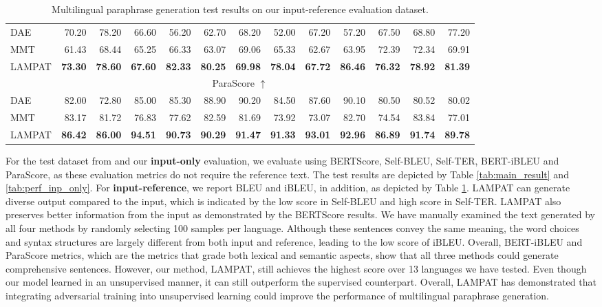 \documentclass[letterpaper]{article} %
\begin{document}
\begin{table}[h!]
{\begin{tabular}{|lrrrrrrrrrrrr|}
\multicolumn{1}{|l|}{DAE} &
  70.20 &
  78.20 &
  66.60 &
  56.20 &
  62.70 &
  68.20 &
  52.00 &
  67.20 &
  57.20 &
  67.50 &
  68.80 &
  77.20 \\
\multicolumn{1}{|l|}{MMT} &
  61.43 &
  68.44 &
  65.25 &
  66.33 &
  63.07 &
  69.06 &
  65.33 &
  62.67 &
  63.95 &
  72.39 &
  72.34 &
  69.91 \\ 
\multicolumn{1}{|l|}{LAMPAT} &
  \textbf{73.30} &
  \textbf{78.60} &
  \textbf{67.60} &
  \textbf{82.33} &
  \textbf{80.25} &
  \textbf{69.98} &
  \textbf{78.04} &
  \textbf{67.72} &
  \textbf{86.46} &
  \textbf{76.32} &
  \textbf{78.92} &
  \textbf{81.39} \\ \hline
\multicolumn{13}{|c|}{ParaScore $\uparrow$} \\ \hline
\multicolumn{1}{|l|}{DAE} &
  82.00 &
  72.80 &
  85.00 &
  85.30 &
  88.90 &
  90.20 &
  84.50 &
  87.60 &
  90.10 &
  80.50 &
  80.52 &
  80.02 \\
\multicolumn{1}{|l|}{MMT} &
  83.17 &
  81.72 &
  76.83 &
  77.62 &
  82.59 &
  81.69 &
  73.92 &
  73.07 &
  82.70 &
  74.54 &
  83.84 &
  77.01 \\
\multicolumn{1}{|l|}{LAMPAT} &
  \textbf{86.42} &
  \textbf{86.00} &
  \textbf{94.51}&
  \textbf{90.73} &
  \textbf{90.29} &
  \textbf{91.47} &
  \textbf{91.33} &
  \textbf{93.01} &
  \textbf{92.96} &
  \textbf{86.89} &
  \textbf{91.74} &
  \textbf{89.78} \\ \hline
\end{tabular}}
\caption{Multilingual paraphrase generation test results on our input-reference evaluation dataset.}
\label{tab:perf_inp_ref}
\end{table}

For the test dataset from \citet{guo2019zeroshot} and our \textbf{input-only} evaluation, we evaluate using BERTScore, Self-BLEU, Self-TER, BERT-iBLEU and ParaScore, as these evaluation metrics do not require the reference text. The test results are depicted by Table \ref{tab:main_result} and \ref{tab:perf_inp_only}. For \textbf{input-reference}, we report BLEU and iBLEU, in addition, as depicted by Table \ref{tab:perf_inp_ref}. LAMPAT can generate diverse output compared to the input, which is indicated by the low score in Self-BLEU and high score in Self-TER. LAMPAT also preserves better information from the input as demonstrated by the BERTScore results. We have manually examined the text generated by all four methods by randomly selecting 100 samples per language. Although these sentences convey the same meaning, the word choices and syntax structures are largely different from both input and reference, leading to the low score of iBLEU. Overall, BERT-iBLEU and ParaScore metrics, which are the metrics that grade both lexical and semantic aspects, show that all three methods could generate comprehensive sentences. However, our method, LAMPAT, still achieves the highest score over 13 languages we have tested. Even though our model learned in an unsupervised manner, it can still outperform the supervised counterpart. Overall, LAMPAT has demonstrated that integrating adversarial training into unsupervised learning could improve the performance of multilingual paraphrase generation.
\end{document}
